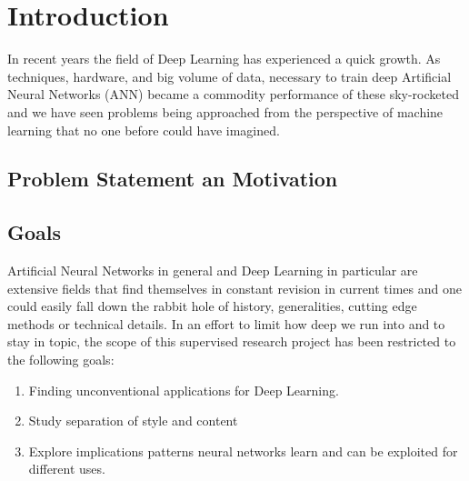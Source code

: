 
\chapter{Introduction}
\label{sec:intro}


In recent years the field of Deep Learning has experienced a quick growth. As techniques, hardware, and big volume of data, necessary to train deep Artificial Neural Networks (ANN) became a commodity performance of these sky-rocketed and we have seen problems being approached from the perspective of machine learning that no one before could have imagined.





\section{Problem Statement an Motivation}
\label{sec:intro:motivation}




\section{Goals}
\label{sec:intro:goals}

Artificial Neural Networks in general and Deep Learning in particular are extensive fields that find themselves in constant revision in current times and one could easily fall down the rabbit hole of history, generalities, cutting edge methods or technical details. In an effort to limit how deep we run into and to stay in topic, the scope of this supervised research project has been restricted to the following goals:

\begin{enumerate}
  \item Finding unconventional applications for Deep Learning.
  \item Study separation of style and content
  \item Explore implications patterns neural networks learn and can be exploited for different uses.
\end{enumerate}


